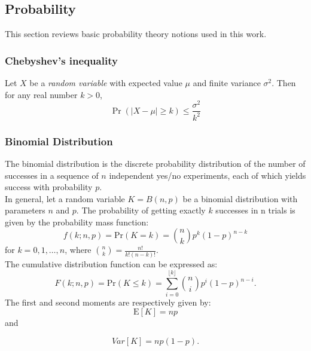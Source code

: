 
\begin{appendices}

\chapter[Appendix]{}

\section{Probability}
This section reviews basic probability theory notions used in this work.
\subsection*{Chebyshev's inequality}
Let $X$ be a \emph{random variable} with expected value $\mu$ and finite variance $\sigma^{2}$. Then for any real number $k>0$,
\begin{equation}
\Pr(\left|X-\mu\right|\geq k)\leq\frac{\sigma^{2}}{k^2}
\label{eq:cheby}
\end{equation}
\subsection*{Binomial Distribution}
The binomial distribution is the discrete probability distribution of the number of successes in a sequence of $n$ independent yes/no experiments, each of which yields success with probability $p$.\\ In general, let a random variable $K=  B(n,p)$ be a binomial distribution with parameters $n$ and $p$. The probability of getting exactly $k$ successes in n trials is given by the probability mass function:
\begin{equation}
f(k;n,p)=\textrm{Pr}(K=k)= {n \choose k} p^{k} (1-p)^{n-k} 
\end{equation}
for $k=0, 1, \ldots, n$, where $\displaystyle{n \choose k}=\frac{n!}{k!(n-k)!}$.\\
The cumulative distribution function can be expressed as:
\begin{equation}
F(k;n,p)=\textrm{Pr}(K\leq k)= \sum_{i=0}^{\lfloor k \rfloor} {n \choose i} p^{i} (1-p)^{n-i}.
\end{equation}
The first and second moments are respectively given by:
\begin{equation}
\textrm{E}[K]=np
\end{equation}
and

\begin{equation}
Var[K]=np(1-p).
\end{equation}



\end{appendices}
